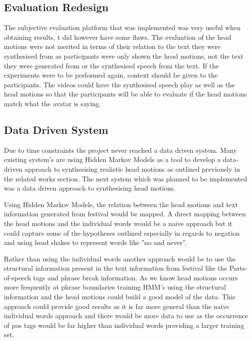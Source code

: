 \documentclass[bsc,frontabs,twoside,singlespacing,parskip]{infthesis}
\begin{document}
\subsection{Evaluation Redesign}

The subjective evaluation platform that was implemented was very useful when obtaining results, t did however have some flaws. The evaluation of the head motions were not merited in terms of their relation to the text they were synthesised from as participants were only shown the head motions, not the text they were generated from or the synthesised speech from the text. If the experiments were to be performed again, context should be given to the participants. The videos could have the synthesised speech play as well as the head motions so that the participants will be able to evaluate if the head motions match what the avatar is saying.

%

\subsection{Data Driven System}

Due to time constraints the project never reached a data driven system. Many existing system's are using Hidden Markov Models as a tool to develop a data-driven approach to synthesising realistic head motions as outlined previously in the related works section. The next system which was planned to be implemented was a data driven approach to synthesising head motions.

Using Hidden Markov Models, the relation between the head motions and text information generated from festival would be mapped. A direct mapping between the head motions and the individual words would be a naive approach but it could capture some of the hypotheses outlined especially in regards to negation and using head shakes to represent words like "no and never".  \cite{head_shaking}

Rather than using the individual words another approach would be to use the structural information present in the text information from festival like the Parts-of-speech tags and phrase break information. As we know head motions occurs more frequently at phrase boundaries \cite{ishi2008} training HMM's using the structural information and the head motions could build a good model of the data. This approach could provide good results as it is far more general than the naive individual words approach and there would be more data to use as the occurrence of pos tags would be far higher than individual words providing a larger training set.



\end{document}
